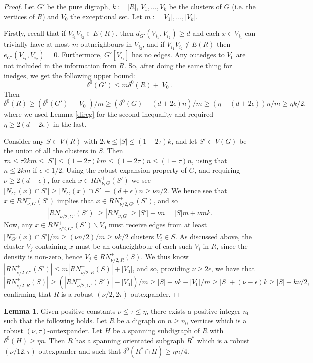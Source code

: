 \documentclass[10pt,letterpaper, reqno]{amsart}
\theoremstyle{definition}
\newtheorem{lemma}[thm]{Lemma}
\numberwithin{equation}{section}
\begin{document}
\begin{proof}
	Let $G'$ be the pure digraph, $k:=|R|$, $V_1,\dots,V_k$ be the clusters of $G$ (i.e. the vertices of $R$) and $V_0$ the exceptional set. Let $m := |V_1|, \dots, |V_k|$. 
	
	Firstly, recall that if $V_{i_1}V_{i_2} \in E(R)$, then $d_{G'}(V_{i_1}, V_{i_2}) \geq d$ and each $x \in V_{i_1}$ can trivially have at most $m$ outneighbours in $V_{i_2}$, and if $V_{i_1} V_{i_2} \not\in E(R)$ then $e_{G'}(V_{i_1}, V_{i_2})=0 $. Furthermore, $G'[V_{i_1}]$ has no edges. Any outedges to $V_0$ are not included in the information from $R$. So, after doing the same thing for inedges, we get the following upper bound: $$\delta^{0}(G') \leq m \delta^{0}(R) + |V_0|.$$
	Then
	$$ \delta^0(R) \geq (\delta^0(G')-|V_0|)/m \geq (\delta^0(G)-(d+2\epsilon)n)/m \geq (\eta - (d+2\epsilon))n/m \geq \eta k/2, $$ where we used Lemma \ref{direg} for the second inequality and required $\eta \geq 2(d+2\epsilon)$ in the last.
	
	Consider any $S \subset V(R)$ with $2\tau k \leq |S| \leq (1-2\tau)k$, and let $S' \subset V(G)$ be the union of all the clusters in $S$. Then $\tau n \leq \tau 2km \leq |S'| \leq (1-2\tau)km \leq (1-2\tau)n \leq (1-\tau)n$, using that $n \leq 2km$ if $\epsilon < 1/2$. Using the robust expansion property of $G$, and requiring $\nu \geq 2(d+\epsilon)$, for each $x \in RN_{\nu, G}^+(S')$ we see $|N_{G'}^{-}(x) \cap S' | \geq |N_G^-(x) \cap S'| - (d+\epsilon)n \geq \nu n/2$. We hence see that $x \in RN_{\nu, G}^+(S')$ implies that $x \in RN_{\nu/2, G'}^+(S')$, and so 
	$$|RN^+_{\nu/2,G'}(S')| \geq |RN^+_{\nu, G}| \geq |S'| + \nu n = |S|m + \nu mk.$$
	Now, any $x \in RN^+_{\nu/2, G'}(S')\backslash V_0$ must receive edges from at least $|N^-_{G'}(x) \cap S'| /m \geq (\nu n /2)/m \geq \nu k/2$ clusters $V_i \in S$. As discussed above, the cluster $V_j$ containing $x$ must be an outneighbour of each such $V_i$ in $R$, since the density is non-zero, hence $V_j \in RN^+_{\nu/2, R}(S)$. We thus know $|RN^+_{\nu/2,G'}(S')| \leq m|RN^+_{\nu/2,R}(S)| + |V_0|$, and so, providing $\nu \geq 2\epsilon$, we have that
	$$ |RN^+_{\nu/2,R}(S)| \geq (|RN^+_{\nu/2, G'}(S')|-|V_0|)/m  \geq |S| + \nu k - |V_0|/m \geq |S| + (\nu-\epsilon)k \geq |S| + k \nu/2,$$
	confirming that $R$ is a robust $(\nu/2,2\tau)$-outexpander.
\end{proof}
 
 
\begin{lemma}\label{IntersectRobustSpanning}
	Given positive constants $\nu \leq \tau \leq \eta$, there exists a positive integer $n_0$ such that the following holds. Let $R$ be a digraph on $n\geq n_0$ vertices which is a robust $(\nu, \tau)$-outexpander. Let $H$ be a spanning subdigraph of $R$ with $\delta^0(H) \geq \eta n$. Then $R$ has a spanning orientated subgraph $R^*$ which is a robust $(\nu/12,\tau)$-outexpander and such that $\delta^0(R^* \cap H) \geq \eta n/4$.
\end{lemma}
\end{document}
